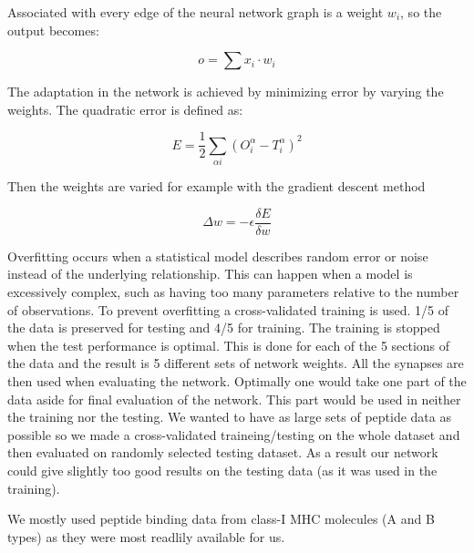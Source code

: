 Associated with every edge of the neural network graph is a weight $w_i$, so the output becomes:

\begin{equation}
o = \sum{x_i \cdot w_i}
\end{equation}

The adaptation in the network is achieved by minimizing error by varying the weights. The quadratic error is defined as:

\begin{equation}
E = \frac{1}{2}\sum_{\alpha i}{(O_i^\alpha - T_i^\alpha)^2}
\end{equation}

Then the weights are varied for example with the gradient descent method

\begin{equation}
\Delta w = -\epsilon \frac{\delta E}{\delta w}
\end{equation}

Overfitting occurs when a statistical model describes random error or noise instead of the underlying relationship.
This can happen when a model is excessively complex, such as having too many parameters relative to the number of observations.
To prevent overfitting a cross-validated training is used. 1/5 of the data is preserved for testing and 4/5 for training. 
The training is stopped when the test performance is optimal. This is done for each of the 5 sections of the data and the result is 5 different sets of network weights.
All the synapses are then used when evaluating the network.
Optimally one would take one part of the data aside for final evaluation of the network. This part would be used in neither the training nor the testing.
We wanted to have as large sets of peptide data as possible so we made a cross-validated traineing/testing on the whole dataset and then evaluated on randomly selected testing dataset.
As a result our network could give slightly too good results on the testing data (as it was used in the training).

We mostly used peptide binding data from class-I MHC molecules (A and B types) as they were most readlily available for us.


